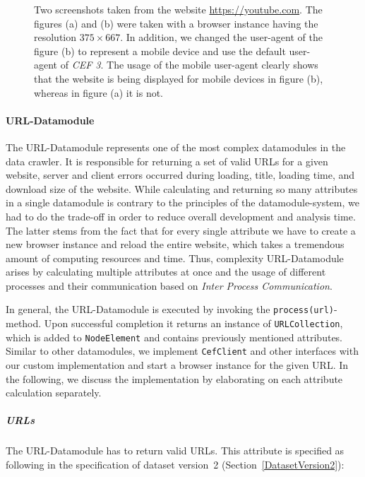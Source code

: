 \begin{figure}
\begin{subfigure}{0.49\linewidth}
		\caption{}
		\label{compare_useragent}
	\end{subfigure}
	\caption[Mobile and desktop screenshots taken by the data crawler]{Two screenshots taken from the website \url{https://youtube.com}. The figures (a) and (b) were taken with a browser instance having the resolution $375 \times 667$. In addition, we changed the user-agent of the figure (b) to represent a mobile device and use the default user-agent of \textit{CEF 3}. The usage of the mobile user-agent clearly shows that the website is being displayed for mobile devices in figure (b), whereas in figure (a) it is not.}
	\label{compare_resolution_useragent}
\end{figure}

\paragraph*{URL-Datamodule}
\label{datacrawler_url_datamodule}
The URL-Datamodule represents one of the most complex datamodules in the data crawler. It is responsible for returning a set of valid URLs for a given website, server and client errors occurred during loading, title, loading time, and download size of the website. While calculating and returning so many attributes in a single datamodule is contrary to the principles of the datamodule-system, we had to do the trade-off in order to reduce overall development and analysis time. The latter stems from the fact that for every single attribute we have to create a new browser instance and reload the entire website, which takes a tremendous amount of computing resources and time. Thus, complexity URL-Datamodule arises by calculating multiple attributes at once and the usage of different processes and their communication based on \textit{Inter Process Communication}.

In general, the URL-Datamodule is executed by invoking the \texttt{process(url)}-method. Upon successful completion it returns an instance of \texttt{URLCollection}, which is added to \texttt{NodeElement} and contains previously mentioned attributes. Similar to other datamodules, we implement \texttt{CefClient} and other interfaces with our custom implementation and start a browser instance for the given URL. In the following, we discuss the implementation by elaborating on each attribute calculation separately.

\subparagraph*{URLs}
The URL-Datamodule has to return valid URLs. This attribute is specified as following in the specification of dataset version~2 (Section~\ref{DatasetVersion2}):

